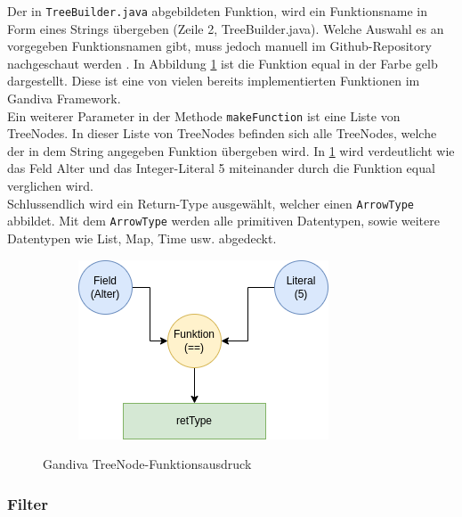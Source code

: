 Der in \texttt{TreeBuilder.java} abgebildeten Funktion, wird ein Funktionsname in Form eines Strings übergeben (Zeile 2, TreeBuilder.java). Welche Auswahl es an vorgegeben Funktionsnamen gibt, muss jedoch manuell im Github-Repository nachgeschaut werden \cite{Github:Arrow:functionregistry}. In Abbildung \ref{graf_5} ist die Funktion \glqq{}equal\grqq{} in der Farbe gelb dargestellt. Diese ist eine von vielen bereits implementierten Funktionen im Gandiva Framework.\\

Ein weiterer Parameter in der Methode \texttt{makeFunction} ist eine Liste von TreeNodes.
In dieser Liste von TreeNodes befinden sich alle TreeNodes, welche der in dem String angegeben Funktion übergeben wird.
In \ref{graf_5} wird verdeutlicht wie das Feld \glqq{}Alter\grqq{} und das Integer-Literal \glqq{}5\grqq{} miteinander durch die Funktion \glqq{}equal\grqq{} verglichen wird. \\
Schlussendlich wird ein Return-Type ausgewählt, welcher einen \texttt{ArrowType} abbildet. Mit dem \texttt{ArrowType} werden alle primitiven Datentypen, sowie weitere Datentypen wie \glqq{}List, Map, Time\grqq{} usw. abgedeckt.

\begin{figure}[h]
  \centering
  \begin{subfigure}[b]{0.5\textwidth}
    \includegraphics[width=1.0\linewidth]{img/gandiva_funktion}
  \end{subfigure}
  \caption{Gandiva TreeNode-Funktionsausdruck}
  \label{graf_5}
\end{figure}

\subsubsection{Filter}

